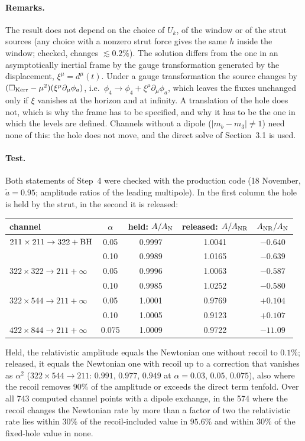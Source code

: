 \documentclass[11pt]{article}
\newcommand{\BoxK}{\Box_{\rm Kerr}}
\begin{document}
\paragraph{Remarks.} The result does not depend on the choice of $U_k$, of the window or of the strut sources (any choice with a
nonzero strut force gives the same $h$ inside the window; checked, changes $\lesssim0.2\%$). The solution differs from the one in an
asymptotically inertial frame by the gauge transformation generated by the displacement, $\xi^\mu=d^\mu(t)$. Under a gauge
transformation the source changes by $(\BoxK-\mu^2)(\xi^\mu\partial_\mu\phi_a)$, i.e.\ $\phi_4\to\phi_4+\xi^\mu\partial_\mu\phi_a$, which leaves the
fluxes unchanged only if $\xi$ vanishes at the horizon and at infinity. A translation of the hole does not, which is why the frame has
to be specified, and why it has to be the one in which the levels are defined.
Channels without a dipole ($|m_b-m_3|\neq1$) need none of this: the hole does not move, and the direct solve of Section~3.1 is used.

\paragraph{Test.} Both statements of Step~4 were checked with the production code (18 November, $\tilde a=0.95$; amplitude ratios of the
leading multipole). In the first column the hole is held by the strut, in the second it is released:

\begin{center}
\begin{tabular}{@{}lcccc@{}}
\toprule
channel & $\alpha$ & held: $A/A_{\rm N}$ & released: $A/A_{\rm NR}$ & $A_{\rm NR}/A_{\rm N}$ \\
\midrule
$211\times211\to322+{\rm BH}$ & 0.05 & 0.9997 & 1.0041 & $-0.640$ \\
                              & 0.10 & 0.9989 & 1.0165 & $-0.639$ \\
$322\times322\to211+\infty$   & 0.05 & 0.9996 & 1.0063 & $-0.587$ \\
                              & 0.10 & 0.9985 & 1.0252 & $-0.580$ \\
$322\times544\to211+\infty$   & 0.05 & 1.0001 & 0.9769 & $+0.104$ \\
                              & 0.10 & 1.0005 & 0.9123 & $+0.107$ \\
$422\times844\to211+\infty$   & 0.075 & 1.0009 & 0.9722 & $-11.09$ \\
\bottomrule
\end{tabular}
\end{center}
Held, the relativistic amplitude equals the Newtonian one without recoil to $0.1\%$; released, it equals the Newtonian one with
recoil up to a correction that vanishes as $\alpha^2$ ($322\times544\to211$: $0.991$, $0.977$, $0.949$ at $\alpha=0.03$, $0.05$, $0.075$),
also where the recoil removes $90\%$ of the amplitude or exceeds the direct term tenfold. Over all 743 computed channel points with
a dipole exchange, in the 574 where the recoil changes the Newtonian rate by more than a factor of two the relativistic rate lies
within $30\%$ of the recoil-included value in $95.6\%$ and within $30\%$ of the fixed-hole value in none.
\end{document}

